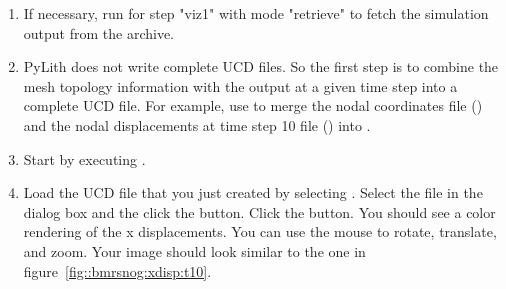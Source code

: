 \begin{enumerate}
\item If necessary, run  for step "viz1" with mode
  "retrieve" to fetch the simulation output from the archive.

  \begin{screen}
    \shellprompt{}
  \end{screen}
  
\item PyLith does not write complete UCD files. So the first step is
  to combine the mesh topology information with the output at a given
  time step into a complete UCD file. For example, use 
  to merge the nodal coordinates file
  () and the nodal displacements at
  time step 10 file () into
  .

  \begin{screen}
    \shellprompt{}
\end{screen}

\item Start  by executing .

  \begin{screen}
    \shellprompt{}
  \end{screen}
  
\item Load the UCD file that you just created by selecting
  \guiselect{}. Select the file in
  the dialog box and the click the  button. Click the
   button. You should see a color rendering of the x
  displacements. You can use the mouse to rotate, translate, and zoom.
  Your image should look similar to the one in
  figure~\ref{fig::bmrsnog:xdisp:t10}.
        

\end{enumerate}
